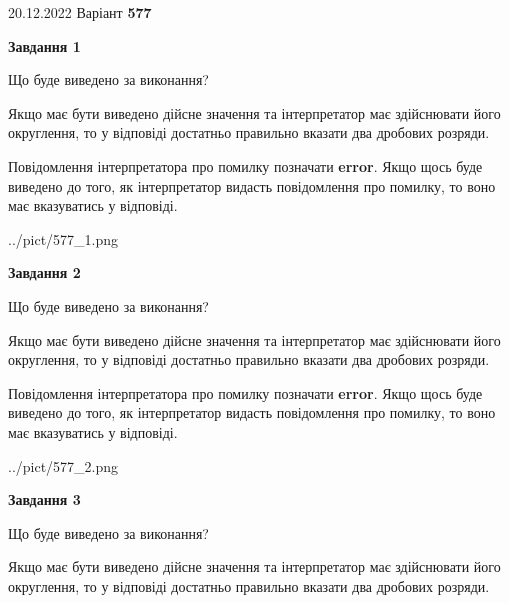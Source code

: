 \documentclass[12pt, ukrainian]{article}
\begin{document}
{20.12.2022 Варіант \No \textbf { 577 }\par}
{
\begin {Large}

{\begin {center}\textbf{Завдання 1}\end {center}}\par
Що буде виведено за виконання? \par

Якщо має бути виведено дійсне значення та інтерпретатор має здійснювати його округлення, 
то у відповіді достатньо правильно вказати два дробових розряди.

Повідомлення інтерпретатора про помилку позначати \textbf{error}.
Якщо щось буде виведено до того, як інтерпретатор видасть повідомлення про помилку, 
то воно має вказуватись у відповіді. \par

\begin{center}
	{../pict/577_1.png}
\end{center}
\newpage

{\begin {center}\textbf{Завдання 2}\end {center}}\par
Що буде виведено за виконання? \par

Якщо має бути виведено дійсне значення та інтерпретатор має здійснювати його округлення, 
то у відповіді достатньо правильно вказати два дробових розряди.

Повідомлення інтерпретатора про помилку позначати \textbf{error}.
Якщо щось буде виведено до того, як інтерпретатор видасть повідомлення про помилку, 
то воно має вказуватись у відповіді. \par

\begin{center}
	{../pict/577_2.png}
\end{center}
\newpage

{\begin {center}\textbf{Завдання 3}\end {center}}\par
Що буде виведено за виконання? \par

Якщо має бути виведено дійсне значення та інтерпретатор має здійснювати його округлення, 
то у відповіді достатньо правильно вказати два дробових розряди.


\end{Large}}
\end{document}
